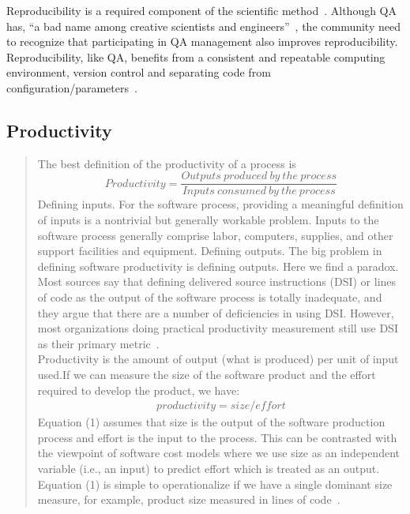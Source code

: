 \documentclass[12pt]{article}
\begin{document}
Reproducibility is a required component of the scientific
method~\cite{Davison2012}.  Although QA has, ``a bad name among creative
scientists and engineers''~\cite[p.~352]{Roache1998}, the community need to
recognize that participating in QA management also improves reproducibility.
Reproducibility, like QA, benefits from a consistent and repeatable computing
environment, version control and separating code from
configuration/parameters~\cite{Davison2012}.

\subsection{Productivity}

\begin{quotation}
    The best definition of the productivity of a process is
    \[Productivity = \dfrac{Outputs\ produced\ by\ the\ process}{Inputs\ consumed\ by\ the\ process}\]
    Defining inputs. For the software process, providing a meaningful definition of inputs is a nontrivial but generally workable problem. Inputs to the software process generally comprise labor, computers, supplies, and other support facilities and equipment. Defining outputs. The big problem in defining software productivity is defining outputs. Here we find a paradox. Most sources say that defining delivered source instructions (DSI) or lines of code as the output of the software process is totally inadequate, and they argue that there are a number of deficiencies in using DSI. However, most organizations doing practical productivity measurement still use DSI as their primary metric~\cite{Boehm1987}.\\

    \smallskip
    Productivity is the amount of output (what is produced) per unit of input used.If we can measure the size of the software product and the effort required to develop the product, we have:
    \begin{align}
        productivity = size/effort
    \end{align}
    Equation (1) assumes that size is the output of the software production process and effort is the input to the process. This can be contrasted with the viewpoint of software cost models where we use size as an independent variable (i.e., an input) to predict effort which is treated as an output. Equation (1) is simple to operationalize if we have a single dominant size measure, for example, product size measured in lines of code~\cite{Kitchenham2004}.
\end{quotation}
\end{document}
